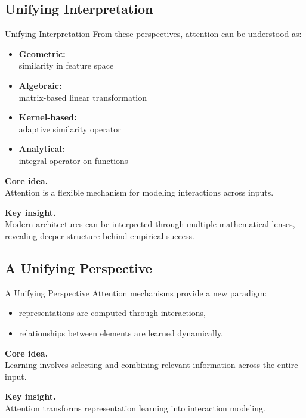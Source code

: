 \documentclass[aspectratio=169,11pt]{beamer}
\begin{document}
\subsection{Unifying Interpretation}
\begin{frame}[t,allowframebreaks]{Unifying Interpretation}
\small
From these perspectives, attention can be understood as:

\begin{itemize}
    \item \textbf{Geometric:}\\ similarity in feature space
    \item \textbf{Algebraic:}\\ matrix-based linear transformation
    \item \textbf{Kernel-based:}\\ adaptive similarity operator
    \item \textbf{Analytical:}\\ integral operator on functions
\end{itemize}

\textbf{Core idea.}\\ Attention is a flexible mechanism for modeling interactions across inputs.

\textbf{Key insight.}\\ Modern architectures can be interpreted through multiple mathematical lenses, revealing deeper structure behind empirical success.
\end{frame}

\subsection{A Unifying Perspective}
\begin{frame}[t,allowframebreaks]{A Unifying Perspective}
\small
Attention mechanisms provide a new paradigm:

\begin{itemize}
    \item representations are computed through interactions,
    \item relationships between elements are learned dynamically.
\end{itemize}

\textbf{Core idea.}\\ Learning involves selecting and combining relevant information across the entire input.

\textbf{Key insight.}\\ Attention transforms representation learning into interaction modeling.
\end{frame}
\end{document}

